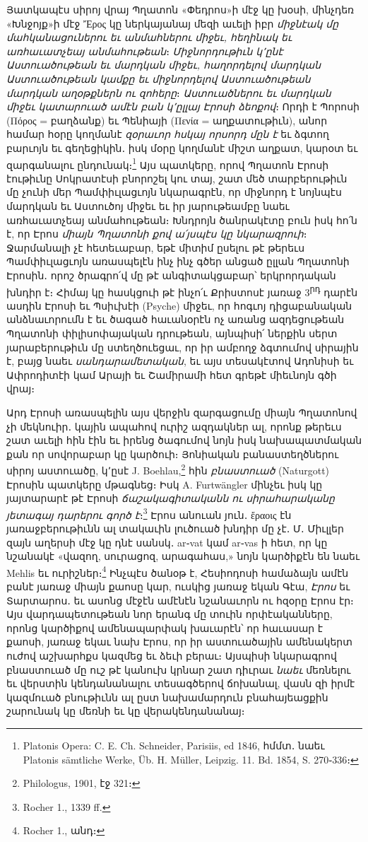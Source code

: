 \documentclass{article}
\begin{document}
{Յատկապէս սիրոյ վրայ Պղատոն «Փեդրոս»ի մէջ կը խօսի, մինչդեռ «Խնջոյք»ի մէջ Ἔρος կը ներկայանայ մեզի աւելի իբր \emph{միջնէակ մը մահկանացուներու եւ անմահներու միջեւ, հեղինակ եւ առհաւատչեայ անմահութեան}։ \emph{Միջնորդութիւն կ՚ընէ Աստուածութեան եւ մարդկան միջեւ, հաղորդելով մարդկան Աստուածութեան կամքը եւ միջնորդելով Աստուածութեան մարդկան աղօթքներն ու զոհերը}։ \emph{Աստուածներու եւ մարդկան միջեւ կատարուած ամէն բան կ՚ըլլայ Էրոսի ձեոքով}։ Որդի է Պորոսի (Πόρος = բաղձանք) եւ Պենիայի (Πενία = աղքատութիւն), անոր համար հօրը կողմանէ \emph{զօրաւոր հսկայ որսորդ մըն է} եւ ձգտող բարւոյն եւ գեղեցիկին․ իսկ մօրը կողմանէ միշտ աղքատ, կարօտ եւ զարգանալու ընդունակ։\footnote{Platonis Opera: C. E. Ch. Schneider, Parisiis, ed 1846, հմմտ․ նաեւ Platonis sämtliche Werke, Üb. H. Müller, Leipzig. 11. Bd. 1854, S. 270֊336։} Այս պատկերը, որով Պղատոն Էրոսի էութիւնը Սոկրատէսի բնորոշել կու տայ, շատ մեծ տարբերութիւն մը չունի մեր Պամփիւլացւոյն նկարագրէն, որ միջնորդ է նոյնպէս մարդկան եւ Աստուծոյ միջեւ եւ իր յարութեամբը նաեւ առհաւատչեայ անմահութեան։ Խնդրոյն ծանրակէտը բուն իսկ հո՛ն է, որ Էրոս \emph{միայն Պղատոնի քով ա՛յսպէս կը նկարազրուի}։ Ջարմանալի չէ հետեւաբար, եթէ միտիմ ըսելու թէ թերեւս Պամփիւլացւոյն առասպելէն ինչ ինչ գծեր անցած ըլլան Պղատոնի Էրոսին․ որոշ ծրագրո՛վ մը թէ անգիտակցաբար՝ երկրորդական խնդիր է։ Հիմայ կը հասկցուի թէ ինչո՛ւ Քրիստոսէ յառաջ 3\textsuperscript{րդ} դարէն ասդին Էրոսի եւ Պսիւխէի (Psyche) միջեւ, որ հոգւոյ դիցաբանական անձնաւորումն է եւ ծագած հաւանօրէն ոչ առանց ազդեցութեան Պղատոնի փիլիսոփայական դրութեան, այնպիսի՛ ներքին սերտ յարաբերութիւն մը ստեղծուեցաւ, որ իր ամբողջ ձգտումով սիրային է, բայց նաեւ \emph{սանդարամետական}, եւ այս տեսակէտով Ադոնիսի եւ Ափրոդիտէի կամ Արայի եւ Շամիրամի հետ գրեթէ միեւնոյն գծի վրայ։

Արդ Էրոսի առասպելին այս վերջին զարգացումը միայն Պղատոնով չի մեկնուիր․ կային ապահով ուրիշ ազդակներ ալ, որոնք թերեւս շատ աւելի հին էին եւ իրենց ծագումով նոյն իսկ նախապատմական քան որ սովորաբար կը կարծուի։ Յոնիական բանաստեղծներու սիրոյ աստուածը, կ՚ըսէ J. Boehlau,\footnote{Philologus, 1901, էջ 321։} հին \emph{բնաստուած} (Naturgott) Էրոսին պատկերը մթագնեց։ Իսկ A. Furtwängler մինչեւ իսկ կը յայտարարէ թէ Էրոսի \emph{ճաշակագիտականն ու սիրահարականը յետագայ դարերու գործ է}։\footnote{Rocher 1., 1339 ff.} Էրոս անուան յուն․ ἔραοις էն յառաջբերութիւնն ալ տակաւին լուծուած խնդիր մը չէ․ Մ․ Միւլլեր զայն աղերսի մէջ կը դնէ սանսկ․ ar֊vat կամ ar֊vas ի հետ, որ կը նշանակէ «վազող, սուրացոզ, արագահաս,» նոյն կարծիքէն են նաեւ Mehlis եւ ուրիշներ։\footnote{Rocher 1., անդ։} Ինչպէս ծանօթ է, Հեսիոդոսի համաձայն ամէն բանէ յառաջ միայն քաոսը կար, ուսկից յառաջ եկան Գէա, \emph{Էրոս} եւ Տարտարոս․ եւ ասոնց մէջէն ամէնէն նշանաւորն ու հզօրը Էրոս էր։ Այս վարդապետութեան նոր երանգ մը տուին որփէականները, որոնց կարծիքով ամենապարփակ խաւարէն՝ որ հաւասար է քաոսի, յառաջ եկաւ նախ Էրոս, որ իր աստուածային ամենակերտ ուժով աշխարհքս կազմեց եւ ձեւի բերաւ։ Այսպիսի նկարագրով բնաստուած մը ուշ թէ կանուխ կրնար շատ դիւրաւ \emph{նաեւ} մեռնելու եւ վերստին կենդանանալու տեսագծերով ճոխանալ, վասն զի իրմէ կազմուած բնութիւնն ալ ըստ նախամարդուն բնահայեացքին շարունակ կը մեռնի եւ կը վերակենդանանայ։

}
\end{document}

